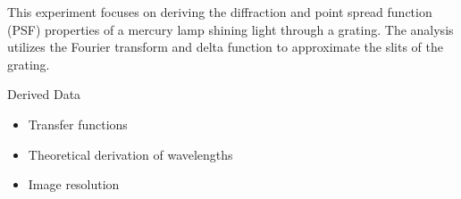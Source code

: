 
This experiment focuses on deriving the diffraction and point spread function (PSF) properties of a mercury lamp shining light through a grating. The analysis utilizes the Fourier transform and delta function to approximate the slits of the grating.

Derived Data
\begin{itemize}
    \item Transfer functions
    \item Theoretical derivation of wavelengths
    \item Image resolution
\end{itemize}
